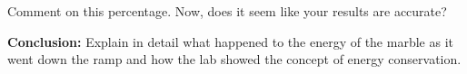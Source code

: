 \documentclass[10pt]{exam}
\begin{document}
\begin{questions}
\question
  Comment on this percentage.  Now, does it seem like your results are accurate?
  \vs 

\question
  {\bf Conclusion:} Explain in detail what happened to the energy of the marble as it went down the ramp and how the lab showed the concept of energy conservation.
  \vs

\end{questions}

\pagebreak \hfill
\end{document}
